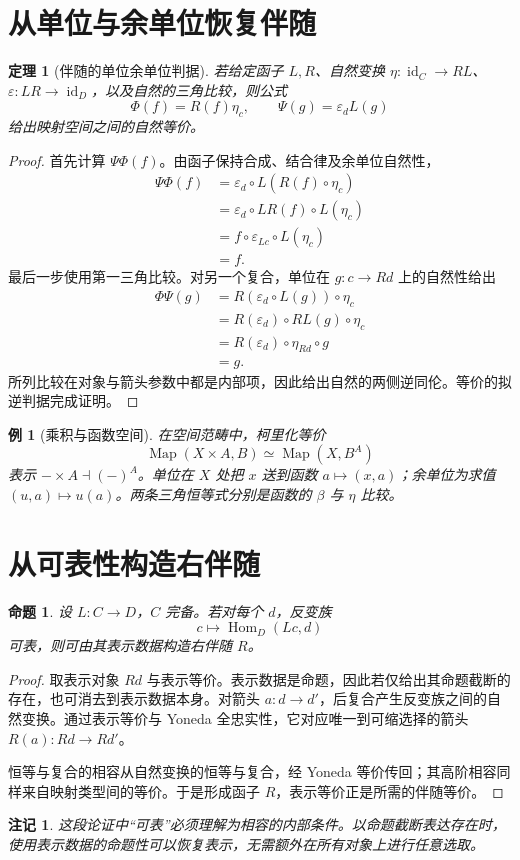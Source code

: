 \documentclass[12pt,oneside,openany,fontset=none]{ctexbook}
\theoremstyle{cn}
\newtheorem{example}[definition]{例}
\newtheorem{proposition}[definition]{命题}
\newtheorem{theorem}[definition]{定理}
\newtheorem{remark}[definition]{注记}
\numberwithin{equation}{chapter}
\newcommand{\id}{\operatorname{id}}
\newcommand{\Hom}{\operatorname{Hom}}
\newcommand{\Map}{\operatorname{Map}}
\begin{document}
\section{从单位与余单位恢复伴随}
\begin{theorem}[伴随的单位余单位判据]
若给定函子 $L,R$、自然变换 $\eta:\id_C\to RL$、$\varepsilon:LR\to\id_D$，以及自然的三角比较，则公式
\[
\Phi(f)=R(f)\eta_c,
\qquad
\Psi(g)=\varepsilon_dL(g)
\]
给出映射空间之间的自然等价。
\end{theorem}
\begin{proof}
首先计算 $\Psi\Phi(f)$。由函子保持合成、结合律及余单位自然性，
\begin{align*}
\Psi\Phi(f)
&=\varepsilon_d\circ L(R(f)\circ\eta_c)\\
&=\varepsilon_d\circ LR(f)\circ L(\eta_c)\\
&=f\circ\varepsilon_{Lc}\circ L(\eta_c)\\
&=f.
\end{align*}
最后一步使用第一三角比较。对另一个复合，单位在 $g:c\to Rd$ 上的自然性给出
\begin{align*}
\Phi\Psi(g)
&=R(\varepsilon_d\circ L(g))\circ\eta_c\\
&=R(\varepsilon_d)\circ RL(g)\circ\eta_c\\
&=R(\varepsilon_d)\circ\eta_{Rd}\circ g\\
&=g.
\end{align*}
所列比较在对象与箭头参数中都是内部项，因此给出自然的两侧逆同伦。等价的拟逆判据完成证明。
\end{proof}
\begin{example}[乘积与函数空间]
在空间范畴中，柯里化等价
\[
\Map(X\times A,B)\simeq\Map(X,B^A)
\]
表示 $-\times A\dashv(-)^A$。单位在 $X$ 处把 $x$ 送到函数 $a\mapsto(x,a)$；余单位为求值 $(u,a)\mapsto u(a)$。两条三角恒等式分别是函数的 $\beta$ 与 $\eta$ 比较。
\end{example}

\section{从可表性构造右伴随}
\begin{proposition}
设 $L:C\to D$，$C$ 完备。若对每个 $d$，反变族
\[
c\longmapsto\Hom_D(Lc,d)
\]
可表，则可由其表示数据构造右伴随 $R$。
\end{proposition}
\begin{proof}
取表示对象 $Rd$ 与表示等价。表示数据是命题，因此若仅给出其命题截断的存在，也可消去到表示数据本身。对箭头 $a:d\to d'$，后复合产生反变族之间的自然变换。通过表示等价与 Yoneda 全忠实性，它对应唯一到可缩选择的箭头 $R(a):Rd\to Rd'$。

恒等与复合的相容从自然变换的恒等与复合，经 Yoneda 等价传回；其高阶相容同样来自映射类型间的等价。于是形成函子 $R$，表示等价正是所需的伴随等价。
\end{proof}
\begin{remark}
这段论证中“可表”必须理解为相容的内部条件。以命题截断表达存在时，使用表示数据的命题性可以恢复表示，无需额外在所有对象上进行任意选取。
\end{remark}
\end{document}
